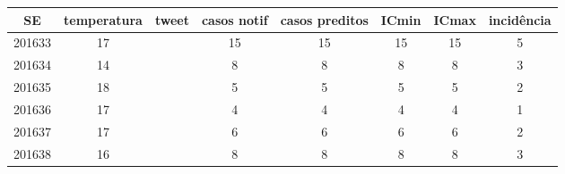 \begin{tabular}{c|ccccccc}
  \hline
SE & temperatura & tweet & casos notif & casos preditos & ICmin & ICmax & incidência \\ 
  \hline
201633 & 17 &  & 15 & 15 & 15 & 15 & 5 \\ 
  201634 & 14 &  & 8 & 8 & 8 & 8 & 3 \\ 
  201635 & 18 &  & 5 & 5 & 5 & 5 & 2 \\ 
  201636 & 17 &  & 4 & 4 & 4 & 4 & 1 \\ 
  201637 & 17 &  & 6 & 6 & 6 & 6 & 2 \\ 
  201638 & 16 &  & 8 & 8 & 8 & 8 & 3 \\ 
   \hline
\end{tabular}
